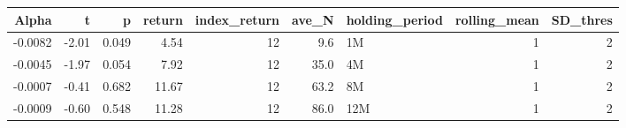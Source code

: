 \begin{table}[ht]
\centering
\begin{tabular}{rrrrrrlrr}
  \hline
Alpha & t & p & return & index\_return & ave\_N & holding\_period & rolling\_mean & SD\_thres \\ 
  \hline
-0.0082 & -2.01 & 0.049 & 4.54 & 12 & 9.6 & 1M &  1 &  2 \\ 
  -0.0045 & -1.97 & 0.054 & 7.92 & 12 & 35.0 & 4M &  1 &  2 \\ 
  -0.0007 & -0.41 & 0.682 & 11.67 & 12 & 63.2 & 8M &  1 &  2 \\ 
  -0.0009 & -0.60 & 0.548 & 11.28 & 12 & 86.0 & 12M &  1 &  2 \\ 
   \hline
\end{tabular}
\end{table}

